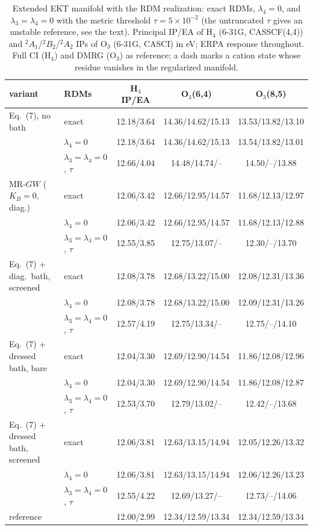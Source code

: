 \documentclass[aip,jcp,reprint,noshowkeys,superscriptaddress]{revtex4-1}
\begin{document}
\begin{table}[t]
\caption{Extended EKT manifold with the RDM realization: exact RDMs,
$\lambda_4=0$, and $\lambda_3=\lambda_4=0$ with the metric threshold
$\tau=5\times10^{-2}$ (the untruncated $\tau$ gives an unstable
reference, see the text).  Principal IP/EA of H$_4$ (6-31G, CASSCF(4,4))
and $^2A_1$/$^2B_2$/$^2A_2$ IPs of O$_3$ (6-31G, CASCI) in eV; ERPA
response throughout.  Full CI (H$_4$) and DMRG (O$_3$) as reference; a dash marks a cation state whose residue vanishes in the regularized manifold.}
\label{tab:cumulant-results}
\begin{ruledtabular}
\begin{tabular}{llccc}
variant & RDMs & H$_4$ IP/EA & O$_3$(6,4) & O$_3$(8,5) \\
\hline
Eq.~(7), no bath & exact & 12.18/3.64 & 14.36/14.62/15.13 & 13.53/13.82/13.10 \\
 & $\lambda_4=0$ & 12.18/3.64 & 14.36/14.62/15.13 & 13.54/13.82/13.01 \\
 & $\lambda_3=\lambda_4=0$, $\tau$ & 12.66/4.04 & 14.48/14.74/-- & 14.50/--/13.88 \\
MR-$GW$ ($K_B=0$, diag.) & exact & 12.06/3.42 & 12.66/12.95/14.57 & 11.68/12.13/12.97 \\
 & $\lambda_4=0$ & 12.06/3.42 & 12.66/12.95/14.57 & 11.68/12.13/12.88 \\
 & $\lambda_3=\lambda_4=0$, $\tau$ & 12.55/3.85 & 12.75/13.07/-- & 12.30/--/13.70 \\
Eq.~(7) + diag.\ bath, screened & exact & 12.08/3.78 & 12.68/13.22/15.00 & 12.08/12.31/13.36 \\
 & $\lambda_4=0$ & 12.08/3.78 & 12.68/13.22/15.00 & 12.09/12.31/13.26 \\
 & $\lambda_3=\lambda_4=0$, $\tau$ & 12.57/4.19 & 12.75/13.34/-- & 12.75/--/14.10 \\
Eq.~(7) + dressed bath, bare & exact & 12.04/3.30 & 12.69/12.90/14.54 & 11.86/12.08/12.96 \\
 & $\lambda_4=0$ & 12.04/3.30 & 12.69/12.90/14.54 & 11.86/12.08/12.87 \\
 & $\lambda_3=\lambda_4=0$, $\tau$ & 12.53/3.70 & 12.79/13.02/-- & 12.42/--/13.68 \\
Eq.~(7) + dressed bath, screened & exact & 12.06/3.81 & 12.63/13.15/14.94 & 12.05/12.26/13.32 \\
 & $\lambda_4=0$ & 12.06/3.81 & 12.63/13.15/14.94 & 12.06/12.26/13.23 \\
 & $\lambda_3=\lambda_4=0$, $\tau$ & 12.55/4.22 & 12.69/13.27/-- & 12.73/--/14.06 \\
reference & & 12.00/2.99 & 12.34/12.59/13.34 & 12.34/12.59/13.34 \\
\end{tabular}
\end{ruledtabular}
\end{table}
\end{document}
